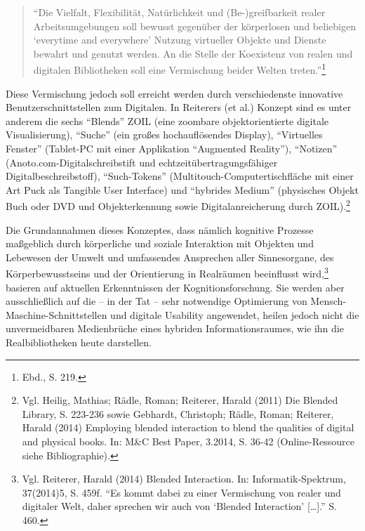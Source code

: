 \documentclass[a4paper,
fontsize=11pt,
oneside,
numbers=noperiodatend,
parskip=half-,
bibliography=totoc,
final
]{scrartcl}
\begin{document}
\begin{quote}
\enquote{Die Vielfalt, Flexibilität, Natürlichkeit und (Be-)greifbarkeit
realer Arbeitsumgebungen soll bewusst gegenüber der körperlosen und
beliebigen \enquote{everytime and everywhere} Nutzung virtueller Objekte
und Dienste bewahrt und genutzt werden. An die Stelle der Koexistenz von
realen und digitalen Bibliotheken soll eine Vermischung beider Welten
treten.}\footnote{Ebd., S. 219.}
\end{quote}

Diese Vermischung jedoch soll erreicht werden durch verschiedenste
innovative Benutzerschnittstellen zum Digitalen. In Reiterers (et al.)
Konzept sind es unter anderem die sechs \enquote{Blends} ZOIL (eine
zoombare objektorientierte digitale Visualisierung), \enquote{Suche}
(ein großes hochauflösendes Display), \enquote{Virtuelles Fenster}
(Tablet-PC mit einer Applikation \enquote{Augmented Reality}),
\enquote{Notizen} (Anoto.com-Digitalschreibstift und
echtzeitübertragungsfähiger Digitalbeschreibstoff),
\enquote{Such-Tokens} (Multitouch-Computertischfläche mit einer Art Puck
als Tangible User Interface) und \enquote{hybrides Medium} (physisches
Objekt Buch oder DVD und Objekterkennung sowie Digitalanreicherung durch
ZOIL).\footnote{Vgl. Heilig, Mathias; Rädle, Roman; Reiterer, Harald
  (2011) Die Blended Library, S. 223-236 sowie Gebhardt, Christoph;
  Rädle, Roman; Reiterer, Harald (2014) Employing blended interaction to
  blend the qualities of digital and physical books. In: M\&C Best
  Paper, 3.2014, S. 36-42 (Online-Ressource siehe Bibliographie).}

Die Grundannahmen dieses Konzeptes, dass nämlich kognitive Prozesse
maßgeblich durch körperliche und soziale Interaktion mit Objekten und
Lebewesen der Umwelt und umfassendes Ansprechen aller Sinnesorgane, des
Körperbewusstseins und der Orientierung in Realräumen beeinflusst
wird,\footnote{Vgl. Reiterer, Harald (2014) Blended Interaction. In:
  Informatik-Spektrum, 37(2014)5, S. 459f. \enquote{Es kommt dabei zu
  einer Vermischung von realer und digitaler Welt, daher sprechen wir
  auch von \enquote{Blended Interaction} {[}\ldots{}{]}.} S. 460.}
basieren auf aktuellen Erkenntnissen der Kognitionsforschung. Sie werden
aber ausschließlich auf die -- in der Tat -- sehr notwendige Optimierung
von Mensch-Maschine-Schnittstellen und digitale Usability angewendet,
heilen jedoch nicht die unvermeidbaren Medienbrüche eines hybriden
Informationsraumes, wie ihn die Realbibliotheken heute darstellen.
\end{document}
